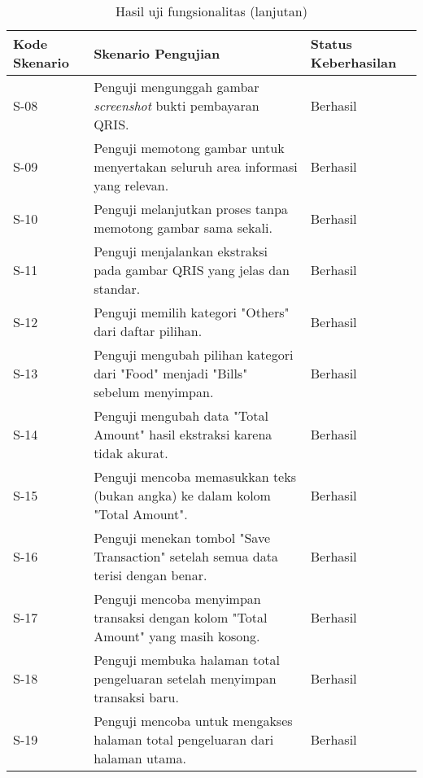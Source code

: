 \begin{table}[h!]
\ContinuedFloat
\caption{Hasil uji fungsionalitas (lanjutan)}
\begin{tabularx}{\linewidth}{|p{2cm}|X|p{2.5cm}|}
\hline
\textbf{Kode Skenario} & \textbf{Skenario Pengujian} & \textbf{Status Keberhasilan} \\
\hline
S-08 & Penguji mengunggah gambar \emph{screenshot} bukti pembayaran QRIS. & Berhasil \\
\hline
S-09 & Penguji memotong gambar untuk menyertakan seluruh area informasi yang relevan. & Berhasil \\
\hline
S-10 & Penguji melanjutkan proses tanpa memotong gambar sama sekali. & Berhasil \\
\hline
S-11 & Penguji menjalankan ekstraksi pada gambar QRIS yang jelas dan standar. & Berhasil \\
\hline
S-12 & Penguji memilih kategori "Others" dari daftar pilihan. & Berhasil \\
\hline
S-13 & Penguji mengubah pilihan kategori dari "Food" menjadi "Bills" sebelum menyimpan. & Berhasil \\
\hline
S-14 & Penguji mengubah data "Total Amount" hasil ekstraksi karena tidak akurat. & Berhasil \\
\hline
S-15 & Penguji mencoba memasukkan teks (bukan angka) ke dalam kolom "Total Amount". & Berhasil \\
\hline
S-16 & Penguji menekan tombol "Save Transaction" setelah semua data terisi dengan benar. & Berhasil \\
\hline
S-17 & Penguji mencoba menyimpan transaksi dengan kolom "Total Amount" yang masih kosong. & Berhasil \\
\hline
S-18 & Penguji membuka halaman total pengeluaran setelah menyimpan transaksi baru. & Berhasil \\
\hline
S-19 & Penguji mencoba untuk mengakses halaman total pengeluaran dari halaman utama. & Berhasil \\
\hline
\end{tabularx}
\end{table}